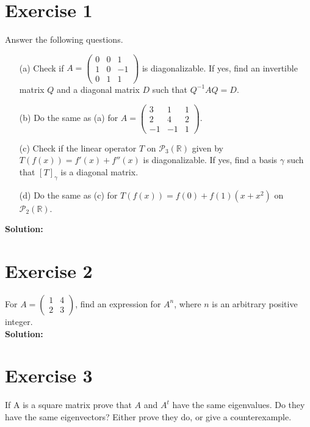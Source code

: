 \documentclass{article}
\begin{document}
\section*{Exercise 1}
Answer the following questions.

\begin{itemize}
    \item[(a)] Check if $A = \begin{pmatrix} 0 & 0 & 1 \\ 1 & 0 & -1 \\ 0 & 1 & 1 \end{pmatrix}$ is diagonalizable. If yes, find an invertible matrix $Q$ and a diagonal matrix $D$ such that $Q^{-1}AQ = D$.
    \item[(b)] Do the same as (a) for $A = \begin{pmatrix} 3 & 1 & 1 \\ 2 & 4 & 2 \\ -1 & -1 & 1 \end{pmatrix}$.
    \item[(c)] Check if the linear operator $T$ on $\mathcal{P}_3(\mathbb{R})$ given by $T(f(x)) = f'(x) + f''(x)$ is diagonalizable. If yes, find a basis $\gamma$ such that $[T]_{\gamma}$ is a diagonal matrix.
    \item[(d)] Do the same as (c) for $T(f(x)) = f(0) + f(1)(x + x^2)$ on $\mathcal{P}_2(\mathbb{R})$.
\end{itemize}

\textbf{Solution:} \\



\newpage

\section*{Exercise 2}
For $A = \begin{pmatrix} 1 & 4 \\ 2 & 3 \end{pmatrix}$, find an expression for $A^n$, where $n$ is an arbitrary positive integer. \\

\textbf{Solution:} \\



\newpage

\section*{Exercise 3}
If A is a square matrix prove that $A$ and $A^t$ have the same eigenvalues. Do they have the same eigenvectors? Either prove they do, or give a counterexample. \\
\end{document}
